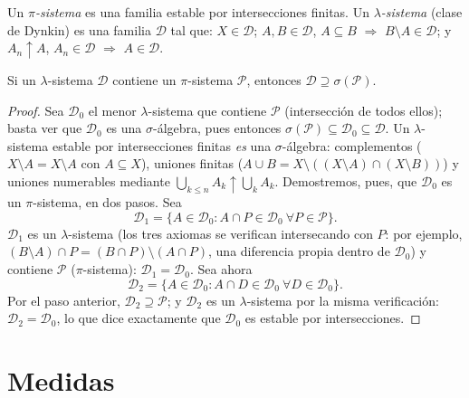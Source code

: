 \begin{definition}\label{def:b3:measure:dynkin}
Un \emph{$\pi$-sistema} es una familia
estable por intersecciones finitas. Un
\emph{$\lambda$-sistema} (clase
de Dynkin) es una familia $\mathcal D$ tal que: $X \in \mathcal
D$; $A, B \in \mathcal D$, $A \subseteq B$ $\Rightarrow$ $B
\setminus A \in \mathcal D$; y $A_n \uparrow A$, $A_n \in
\mathcal D$ $\Rightarrow$ $A \in \mathcal D$.
\end{definition}

\begin{theorem}
\label{thm:b3:measure:dynkin}
Si un $\lambda$-sistema $\mathcal D$ contiene un $\pi$-sistema
$\mathcal P$, entonces $\mathcal D \supseteq
\sigma(\mathcal P)$.
\end{theorem}

\begin{proof}
Sea $\mathcal D_0$ el menor $\lambda$-sistema que contiene $\mathcal P$
(intersección de todos ellos); basta ver que $\mathcal D_0$ es una
$\sigma$-álgebra, pues entonces
$\sigma(\mathcal P) \subseteq \mathcal D_0 \subseteq \mathcal
D$. Un $\lambda$-sistema estable por intersecciones finitas \emph{es}
una $\sigma$-álgebra: complementos ($X \setminus A = X
\setminus A$ con $A \subseteq X$), uniones finitas ($A \cup B =
X \setminus ((X\setminus A)\cap(X\setminus B))$) y uniones numerables
mediante $\bigcup_{k \leq n}A_k \uparrow \bigcup_kA_k$. Demostremos,
pues, que $\mathcal D_0$ es un $\pi$-sistema, en dos pasos. Sea
\[
\mathcal D_1 = \{A \in \mathcal D_0 : A \cap P \in \mathcal
D_0 \ \forall P \in \mathcal P\}.
\]
$\mathcal D_1$ es un $\lambda$-sistema (los tres axiomas se verifican
intersecando con $P$: por ejemplo, $(B\setminus A)\cap P
= (B \cap P)\setminus(A \cap P)$, una diferencia propia dentro de
$\mathcal D_0$) y contiene $\mathcal P$ ($\pi$-sistema):
$\mathcal D_1 = \mathcal D_0$. Sea ahora
\[
\mathcal D_2 = \{A \in \mathcal D_0 : A \cap D \in \mathcal
D_0\ \forall D \in \mathcal D_0\}.
\]
Por el paso anterior, $\mathcal D_2 \supseteq \mathcal P$; y
$\mathcal D_2$ es un $\lambda$-sistema por la misma verificación:
$\mathcal D_2 = \mathcal D_0$, lo que dice exactamente que
$\mathcal D_0$ es estable por intersecciones.
\end{proof}

\section{Medidas}


